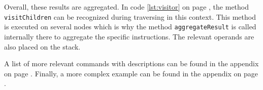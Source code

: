Overall, these results are aggregated. In code \ref{lst:visitor} on page \pageref{lst:visitor}, the method \texttt{visitChildren} can be recognized during traversing in this context. This method is executed on several nodes which is why the method \texttt{aggregateResult} is called internally there to aggregate the specific instructions. The relevant operands are also placed on the stack.

A list of more relevant commands with descriptions can be found in the appendix on page \pageref{sec:jasmin_instructions}. Finally, a more complex example can be found in the appendix on page \pageref{sec:eprogram}.